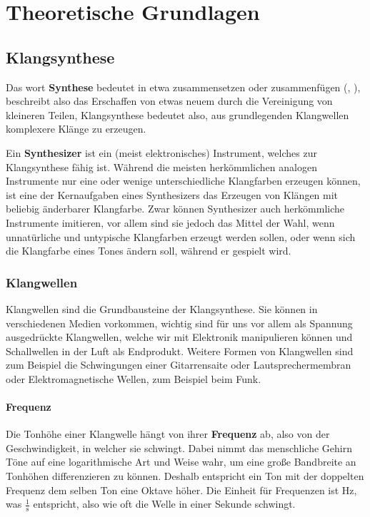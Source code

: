 \chapter{Theoretische Grundlagen}

\section{Klangsynthese}
\label{sec:org3d6eaff}
Das wort \textbf{Synthese} bedeutet in etwa zusammensetzen oder zusammenfügen (, ), beschreibt also das Erschaffen von etwas neuem durch die Vereinigung von kleineren Teilen, Klangsynthese bedeutet also, aus grundlegenden Klangwellen komplexere Klänge zu erzeugen.

Ein \textbf{Synthesizer} ist ein (meist elektronisches) Instrument, welches zur Klangsynthese fähig ist. Während die meisten herkömmlichen analogen Instrumente nur eine oder wenige unterschiedliche Klangfarben erzeugen können, ist eine der Kernaufgaben eines Synthesizers das Erzeugen von Klängen mit beliebig änderbarer Klangfarbe. Zwar können Synthesizer auch herkömmliche Instrumente imitieren, vor allem sind sie jedoch das Mittel der Wahl, wenn unnatürliche und untypische Klangfarben erzeugt werden sollen, oder wenn sich die Klangfarbe eines Tones ändern soll, während er gespielt wird.

\subsection{Klangwellen}
\label{sec:org27e1416}
Klangwellen sind die Grundbausteine der Klangsynthese. Sie können in verschiedenen Medien vorkommen, wichtig sind für uns vor allem als Spannung ausgedrückte Klangwellen, welche wir mit Elektronik manipulieren können und Schallwellen in der Luft als Endprodukt. Weitere Formen von Klangwellen sind zum Beispiel die Schwingungen einer Gitarrensaite oder Lautsprechermembran oder Elektromagnetische Wellen, zum Beispiel beim Funk.

\subsubsection{Frequenz}
\label{sec:org4324ed8}
Die Tonhöhe einer Klangwelle hängt von ihrer \textbf{Frequenz} ab, also von der Geschwindigkeit, in welcher sie schwingt. Dabei nimmt das menschliche Gehirn Töne auf eine logarithmische Art und Weise wahr, um eine große Bandbreite an Tonhöhen differenzieren zu können. Deshalb entspricht ein Ton mit der doppelten Frequenz dem selben Ton eine Oktave höher. Die Einheit für Frequenzen ist \si{\hertz}, was \(\frac{1}{\si{\second}}\) entspricht, also wie oft die Welle in einer Sekunde schwingt.

